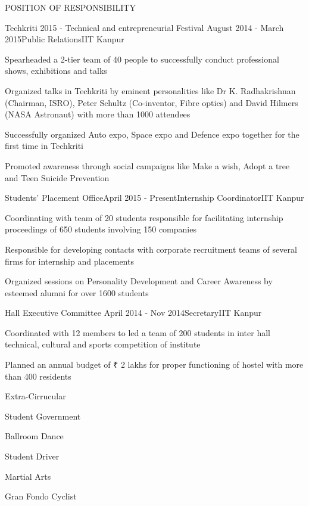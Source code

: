 \documentclass{resume} %
\begin{document}
\begin{rSection}{POSITION OF RESPONSIBILITY}

\begin{rSubsection}{Techkriti 2015 - Technical and entrepreneurial Festival }{August 2014 - March 2015}{Public Relations}{IIT Kanpur}
\item Spearheaded a 2-tier team of 40 people to successfully conduct professional shows, exhibitions and talks
\item Organized talks in Techkriti by eminent personalities like Dr K. Radhakrishnan (Chairman, ISRO), Peter Schultz (Co-inventor, Fibre optics) and David Hilmers (NASA Astronaut) with more than 1000 attendees
\item Successfully organized Auto expo, Space expo and Defence expo together for the first time in Techkriti
\item Promoted awareness through social campaigns like Make a wish, Adopt a tree and Teen Suicide Prevention
\end{rSubsection}


\begin{rSubsection}{Students' Placement Office}{April 2015 - Present}{Internship Coordinator}{IIT Kanpur}
\item Coordinating with team of 20 students responsible for facilitating internship proceedings of 650 students involving 150 companies
 \item Responsible for developing contacts with corporate recruitment teams of several firms for internship and placements 
 \item Organized sessions on Personality Development and Career Awareness by esteemed alumni for over 1600 students
\end{rSubsection}


\begin{rSubsection}{Hall Executive Committee }{April 2014 - Nov 2014}{Secretary}{IIT Kanpur}
\item Coordinated with 12 members to led a team of 200 students in inter hall technical, cultural and sports competition of institute 
\item Planned an annual budget of ₹ 2 lakhs for proper functioning of hostel with more than 400 residents
\end{rSubsection}

\end{rSection}
\fi
\begin{rSection}{Extra-Cirrucular} \itemsep -3pt
\item Student Government
\item Ballroom Dance
\item Student Driver
\item Martial Arts
\item Gran Fondo Cyclist

\end{rSection}
\end{document}
